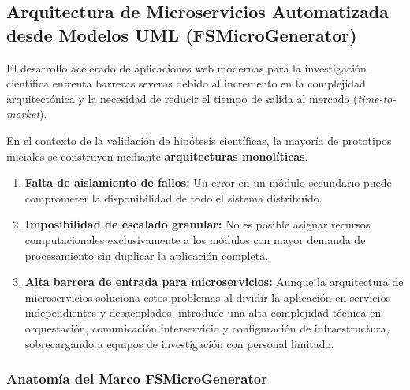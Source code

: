 \subsection{Arquitectura de Microservicios Automatizada desde Modelos UML (FSMicroGenerator)}

El desarrollo acelerado de aplicaciones web modernas para la investigación científica enfrenta barreras severas debido al incremento en la complejidad arquitectónica y la necesidad de reducir el tiempo de salida al mercado (\textit{time-to-market}). %

En el contexto de la validación de hipótesis científicas, la mayoría de prototipos iniciales se construyen mediante \textbf{arquitecturas monolíticas}. %

\begin{enumerate}
    \item \textbf{Falta de aislamiento de fallos:} Un error en un módulo secundario puede comprometer la disponibilidad de todo el sistema distribuido. %
    \item \textbf{Imposibilidad de escalado granular:} No es posible asignar recursos computacionales exclusivamente a los módulos con mayor demanda de procesamiento sin duplicar la aplicación completa. %
    \item \textbf{Alta barrera de entrada para microservicios:} Aunque la arquitectura de microservicios soluciona estos problemas al dividir la aplicación en servicios independientes y desacoplados, introduce una alta complejidad técnica en orquestación, comunicación interservicio y configuración de infraestructura, sobrecargando a equipos de investigación con personal limitado. %
\end{enumerate}

\subsubsection{Anatomía del Marco FSMicroGenerator}

